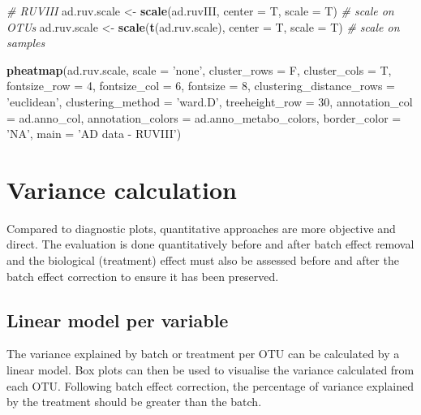 \documentclass[]{book}
\newenvironment{Shaded}{\begin{snugshade}}{\end{snugshade}}
\newcommand{\KeywordTok}[1]{\textcolor[rgb]{0.13,0.29,0.53}{\textbf{#1}}}
\newcommand{\DataTypeTok}[1]{\textcolor[rgb]{0.13,0.29,0.53}{#1}}
\newcommand{\DecValTok}[1]{\textcolor[rgb]{0.00,0.00,0.81}{#1}}
\newcommand{\StringTok}[1]{\textcolor[rgb]{0.31,0.60,0.02}{#1}}
\newcommand{\CommentTok}[1]{\textcolor[rgb]{0.56,0.35,0.01}{\textit{#1}}}
\newcommand{\NormalTok}[1]{#1}
\begin{document}
\begin{Shaded}
\begin{Highlighting}[]
\CommentTok{# RUVIII}
\NormalTok{ad.ruv.scale <-}\StringTok{ }\KeywordTok{scale}\NormalTok{(ad.ruvIII, }\DataTypeTok{center =}\NormalTok{ T, }\DataTypeTok{scale =}\NormalTok{ T) }\CommentTok{# scale on OTUs}
\NormalTok{ad.ruv.scale <-}\StringTok{ }\KeywordTok{scale}\NormalTok{(}\KeywordTok{t}\NormalTok{(ad.ruv.scale), }\DataTypeTok{center =}\NormalTok{ T, }\DataTypeTok{scale =}\NormalTok{ T) }\CommentTok{# scale on samples}

\KeywordTok{pheatmap}\NormalTok{(ad.ruv.scale, }
         \DataTypeTok{scale =} \StringTok{'none'}\NormalTok{, }
         \DataTypeTok{cluster_rows =}\NormalTok{ F, }
         \DataTypeTok{cluster_cols =}\NormalTok{ T, }
         \DataTypeTok{fontsize_row =} \DecValTok{4}\NormalTok{, }\DataTypeTok{fontsize_col =} \DecValTok{6}\NormalTok{,}
         \DataTypeTok{fontsize =} \DecValTok{8}\NormalTok{,}
         \DataTypeTok{clustering_distance_rows =} \StringTok{'euclidean'}\NormalTok{,}
         \DataTypeTok{clustering_method =} \StringTok{'ward.D'}\NormalTok{,}
         \DataTypeTok{treeheight_row =} \DecValTok{30}\NormalTok{,}
         \DataTypeTok{annotation_col =}\NormalTok{ ad.anno_col,}
         \DataTypeTok{annotation_colors =}\NormalTok{ ad.anno_metabo_colors,}
         \DataTypeTok{border_color =} \StringTok{'NA'}\NormalTok{,}
         \DataTypeTok{main =} \StringTok{'AD data - RUVIII'}\NormalTok{)}
\end{Highlighting}
\end{Shaded}

\section{Variance calculation}\label{variance-calculation}

Compared to diagnostic plots, quantitative approaches are more objective
and direct. The evaluation is done quantitatively before and after batch
effect removal and the biological (treatment) effect must also be
assessed before and after the batch effect correction to ensure it has
been preserved.

\subsection{Linear model per variable}\label{linear-model-per-variable}

The variance explained by batch or treatment per OTU can be calculated
by a linear model. Box plots can then be used to visualise the variance
calculated from each OTU. Following batch effect correction, the
percentage of variance explained by the treatment should be greater than
the batch.
\end{document}
